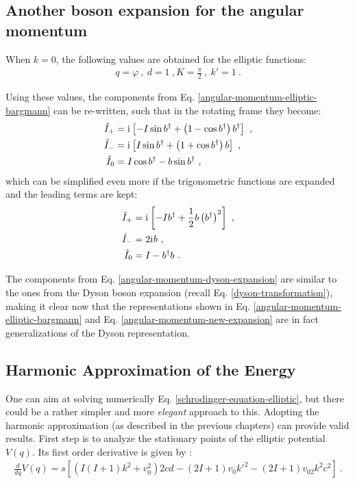 \subsection{Another boson expansion for the angular momentum}

When $k=0$, the following values are obtained for the elliptic functions:
\begin{align}
    q=\varphi\ ,\ d=1\ , K=\frac{\pi}{2}\ ,\ k'=1\ .
\end{align}

Using these values, the components from Eq. \ref{angular-momentum-elliptic-bargmann} can be re-written, such that in the rotating frame they become:
\begin{align}
    \hat{I}_+&=\mathrm{i}\mkern1mu\left[-I\sin b^\dagger+\left(1-\cos b^\dagger\right)b^\dagger\right]\ ,\nonumber\\
    \hat{I}_-&=\mathrm{i}\mkern1mu\left[I\sin b^\dagger+\left(1+\cos b^\dagger\right)b\right]\ ,\nonumber\\
    \hat{I}_0&=I\cos b^\dagger-b\sin b^\dagger\ ,
    \label{angular-momentum-new-expansion}
\end{align}
which can be simplified even more if the trigonometric functions are expanded and the leading terms are kept:
\begin{align}
    \hat{I}_+&=\iu\left[-Ib^\dagger+\frac{1}{2}b\left(b^\dagger\right)^2\right]\ ,\nonumber\\
    \hat{I}_-&=2\iu b\ ,\nonumber\\
    \hat{I}_0&=I-b^\dagger b\ .
    \label{angular-momentum-dyson-expansion}
\end{align}

The components from Eq. \ref{angular-momentum-dyson-expansion} are similar to the ones from the Dyson boson expansion (recall Eq. \ref{dyson-transformation}), making it clear now that the representations shown in Eq. \ref{angular-momentum-elliptic-bargmann} and Eq. \ref{angular-momentum-new-expansion} are in fact generalizations of the Dyson representation.

\subsection{Harmonic Approximation of the Energy}

One can aim at solving numerically Eq. \ref{schrodinger-equation-elliptic}, but there could be a rather simpler and more \emph{elegant} approach to this. Adopting the harmonic approximation (as described in the previous chapters) can provide valid results. First step is to analyze the stationary points of the elliptic potential $V(q)$. Its first order derivative is given by \cite{raduta2020new}:
\begin{align}
    \frac{d}{dq}V(q)=s\left[\left(I(I+1)k^2+v_0^2\right)2cd-(2I+1)v_0k'^2-(2I+1)v_02k^2c^2\right]\ .
\end{align}

